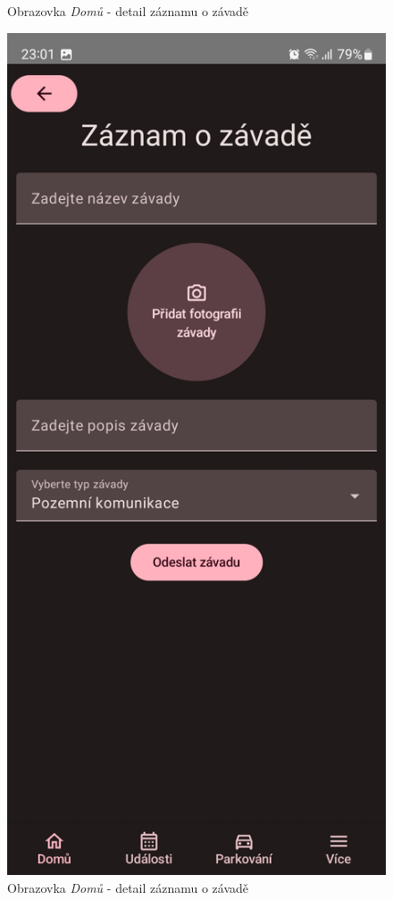 \begin{figure}[H]
    \caption{Obrazovka \textit{Domů} - detail záznamu o závadě}
  \endminipage\hfill
    \includegraphics[width=\linewidth]{screens/1c_B.jpg}
    \caption{Obrazovka \textit{Domů} - detail záznamu o závadě}
  \endminipage\hfill
\end{figure}

